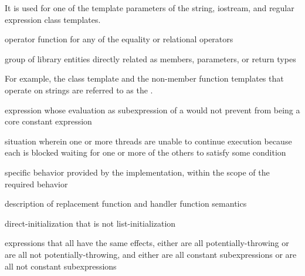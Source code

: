 \begin{defnote}
It is used for one of the template parameters of the string,
iostream, and regular expression class templates.
\end{defnote}

%
operator function for any of the equality or
relational operators

%
group of library entities directly related as members, parameters, or
return types

\begin{defnote}
For example, the class template
and the non-member
function templates
that operate on
strings are referred to as the
.
\end{defnote}

%
expression whose evaluation as subexpression of a
 would not prevent 
from being a core constant expression

%
situation wherein
one or more threads are unable to continue execution because each is
blocked waiting for one or more of the others to satisfy some condition

%
specific behavior provided by the implementation,
within the scope of the required behavior

%
description of replacement function and handler function
semantics

%
direct-initialization
that is not list-initialization

%
expressions that all have the same effects,
either
are all potentially-throwing or
are all not potentially-throwing,
and
either
are all constant subexpressions or
are all not constant subexpressions

